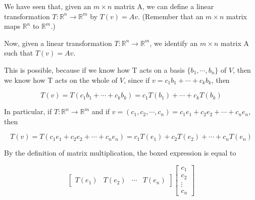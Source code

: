 


We have seen that, given an $m \times n$ matrix A, we can define a linear transformation $T : \mathbb{R}^n \to \mathbb{R}^m$ by $T(v) = Av$. (Remember that an $m \times n$ matrix maps $\mathbb{R}^n$ to $\mathbb{R}^m$.) 

Now, given a linear transformation $T : \mathbb{R}^n \to \mathbb{R}^m$, we identify an $m \times n$ matrix A such that $T(v) = Av$. 

This is possible, because if we know how T acts on a basis $\{b_1, \cdots, b_n\}$ of $V$, then we know how T acts on the whole of $V$, since if $v = c_1b_1 + \cdots + c_kb_k$, then 

\[
    T(v) = T(c_1b_1 + \cdots + c_kb_k) = c_1T(b_1) + \cdots + c_kT(b_k)
\]

In particular, if $T : \mathbb{R}^n \to \mathbb{R}^m$ and if $v = (c_1, c_2, \cdots, c_n) = c_1e_1 + c_2e_2 + \cdots + c_ne_n$, then

\[T(v) = T(c_1e_1 + c_2e_2 + \cdots + c_ne_n) = \boxed{c_1T(e_1) + c_2T(e_2) + \cdots + c_nT(e_n)}\]

By the definition of matrix multiplication, the boxed expression is equal to

\[
    \begin{bmatrix}
        T(e_1) & T(e_2) & \cdots & T(e_n)
    \end{bmatrix}
    \begin{bmatrix}
        c_1\\
        c_2\\
        \vdots\\
        c_n
    \end{bmatrix}
\]

